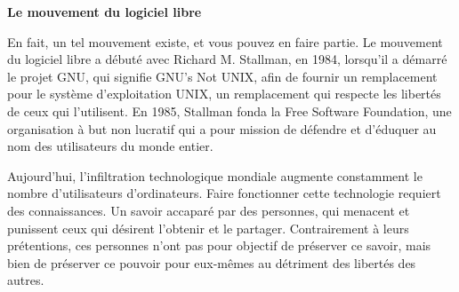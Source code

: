 \documentclass[12pt]{article}
\begin{document}
\begin{center}
{\Large\bf Le mouvement du logiciel libre}
\end{center}

En fait, un tel mouvement existe, et vous pouvez en faire partie. Le mouvement
du logiciel libre a débuté avec Richard M. Stallman, en 1984, lorsqu'il a
démarré le projet GNU, qui signifie \guillemotleft GNU's Not
UNIX\guillemotright, afin de fournir un remplacement pour le système
d'exploitation UNIX, un remplacement qui respecte les libertés de ceux qui
l'utilisent. En 1985, Stallman fonda la Free Software Foundation, une
organisation à but non lucratif qui a pour mission de défendre et d'éduquer au
nom des utilisateurs du monde entier.


Aujourd'hui, l'infiltration technologique mondiale augmente constamment le
nombre d'utilisateurs d'ordinateurs. Faire fonctionner cette technologie
requiert des connaissances. Un savoir accaparé par des personnes, qui menacent
et punissent ceux qui désirent l'obtenir et le partager. Contrairement à leurs
prétentions, ces personnes n'ont pas pour objectif de préserver ce savoir, mais
bien de préserver ce pouvoir pour eux-mêmes au détriment des libertés des
autres.

\end{document}
